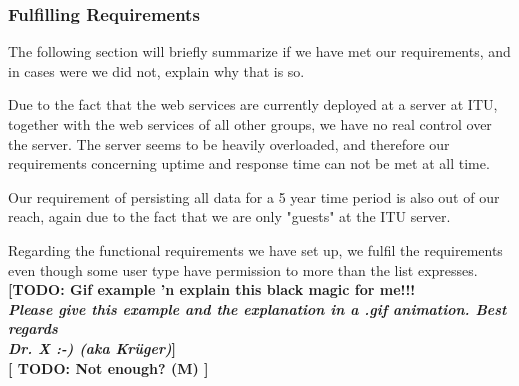 \subsubsection{Fulfilling Requirements}
\label{serverfulfil}
The following section will briefly summarize if we have met our requirements, and in cases were we did not, explain why that is so.

Due to the fact that the web services are currently deployed at a server at ITU, together with the web services of all other groups, we have no real control over the server. The server seems to be heavily overloaded, and therefore our requirements concerning uptime and response time can not be met at all time.

Our requirement of persisting all data for a 5 year time period is also out of our reach, again due to the fact that we are only "guests" at the ITU server.

Regarding the functional requirements we have set up, we fulfil the requirements even though some user type have permission to more than the list expresses.
\textbf{[TODO: Gif example 'n explain this black magic for me!!! \\\textit{Please give this example and the explanation in a .gif animation. Best regards\\Dr. X :-) (aka Krüger)}]}\\
\textbf{[ TODO: Not enough? (M) ]}